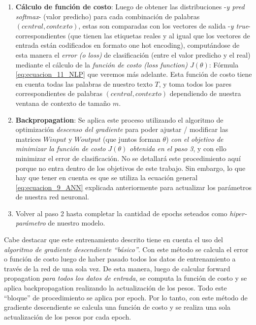 \documentclass[12pt,a4paper]{article}
\begin{document}
\begin{sloppypar}
\begin{enumerate}
\begin{itemize}
\end{itemize}

\item \textbf{Cálculo de función de costo}: Luego de obtener las distribuciones -\textit{y pred softmax}- (valor predicho) para cada combinación de palabras $(central, contexto)$, estas son comparadas con los vectores de salida -\textit{y true}- correspondientes (que tienen las etiquetas reales y al igual que los vectores de entrada están codificados en formato one hot encoding), computándose de esta manera el \textit{error (o loss)} de clasificación (entre el valor predicho y el real) mediante el cálculo de la \textit{función de costo (loss function) $J(\theta)$}: Fórmula \ref{eq:ecuacion_11_NLP} que veremos más adelante. Esta función de costo tiene en cuenta todas las palabras de nuestro texto $T$, y toma todos los pares correspondientes de palabras $(central, contexto)$ dependiendo de nuestra ventana de contexto de tamaño $m$.

\item \textbf{Backpropagation}: Se aplica este proceso utilizando el algoritmo de optimización \textit{descenso del gradiente} para poder ajustar / modificar las matrices $W input$ y $W output$ (que juntos forman $\theta$) \textit{con el objetivo de minimizar la función de costo $J(\theta)$ obtenida en el paso 3}, y con ello minimizar el error de clasificación. No se detallará este procedimiento aquí porque no entra dentro de los objetivos de este trabajo. Sin embargo, lo que hay que tener en cuenta es que se utiliza la ecuación general \ref{eq:ecuacion_9_ANN} explicada anteriormente para actualizar los parámetros de nuestra red neuronal. 

\item Volver al paso 2 hasta completar la cantidad de epochs seteados como \textit{hiper-parámetro} de nuestro modelo. 

\end{enumerate}

Cabe destacar que este entrenamiento descrito tiene en cuenta el uso del \textit{algoritmo de gradiente descendiente “básico”}. Con este método se calcula el error o función de costo luego de haber pasado todos los datos de entrenamiento a través de la red de una sola vez. De esta manera, luego de calcular forward propagation \textit{para todos los datos de entrada}, se computa la función de costo y se aplica backpropagation realizando la actualización de los pesos. Todo este “bloque” de procedimiento se aplica por epoch. Por lo tanto, con este método de gradiente descendiente se calcula una función de costo y se realiza una sola actualización de los pesos por cada epoch.


\end{sloppypar}
\end{document}
